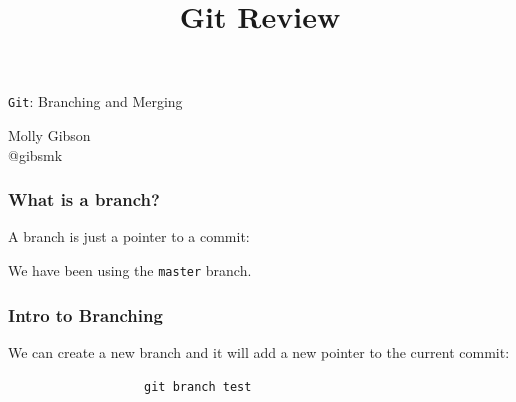 \documentclass{beamer}
\title{Git Review}
\begin{document}
\begin{frame}
\begin{center}
 \texttt{Git}: Branching and Merging
 \vspace{30pt}
 
 Molly Gibson\\
 @gibsmk
\end{center}
\end{frame}

\begin{frame}
\frametitle{What is a branch?}
A branch is just a pointer to a commit:
\begin{center}

\vspace{20pt}
We have been using the \texttt{master} branch.
\end{center}

\end{frame}

\begin{frame}[fragile]
\frametitle{Intro to Branching}
We can create a new branch and it will add a new pointer to the current commit:
\begin{center}

\begin{verbatim}
                   git branch test
\end{verbatim}
\end{center}
\end{frame}
\end{document}

